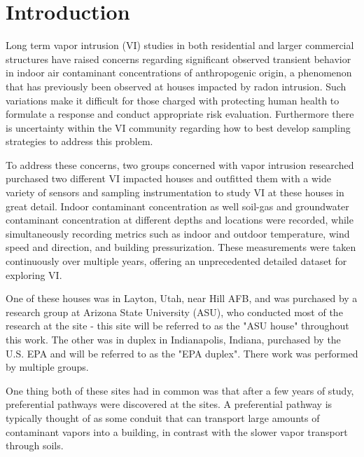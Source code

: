 \section{Introduction}\label{chp4:intro}

Long term vapor intrusion (VI) studies in both residential and larger commercial structures have raised concerns regarding significant observed transient behavior in indoor air contaminant concentrations of anthropogenic origin\cite{u.s._environmental_protection_agency_oswer_2015,folkes_observed_2009,holton_temporal_2013,johnston_spatiotemporal_2014,hosangadi_high-frequency_2017,mchugh_recent_2017,u.s._environmental_protection_agency_assessment_2015}, a phenomenon that has previously been observed at houses impacted by radon intrusion\cite{hubbard_time-variation_1996}.
Such variations make it difficult for those charged with protecting human health to formulate a response and conduct appropriate risk evaluation.
Furthermore there is uncertainty within the VI community regarding how to best develop sampling strategies to address this problem\cite{u.s._environmental_protection_agency_oswer_2015,holton_temporal_2013,johnson_integrated_2016,mchugh_recent_2017}.\par

To address these concerns, two groups concerned with vapor intrusion researched purchased two different VI impacted houses and outfitted them with a wide variety of sensors and sampling instrumentation to study VI at these houses in great detail.
Indoor contaminant concentration as well soil-gas and groundwater contaminant concentration at different depths and locations were recorded, while simultaneously recording metrics such as indoor and outdoor temperature, wind speed and direction, and building pressurization.
These measurements were taken continuously over multiple years, offering an unprecedented detailed dataset for exploring VI.\par

One of these houses was in Layton, Utah, near Hill AFB, and was purchased by a research group at Arizona State University (ASU), who conducted most of the research at the site - this site will be referred to as the "ASU house" throughout this work\cite{holton_temporal_2013}.
The other was in duplex in Indianapolis, Indiana, purchased by the U.S. EPA and will be referred to as the "EPA duplex".
There work was performed by multiple groups.\par

One thing both of these sites had in common was that after a few years of study, preferential pathways were discovered at the sites.
A preferential pathway is typically thought of as some conduit that can transport large amounts of contaminant vapors into a building, in contrast with the slower vapor transport through soils.\par

